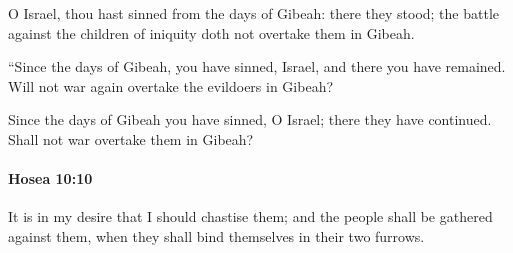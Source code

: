 			\begin{versebox}
					\item[BHS] 
					\item[LXX] 
					\item[ASV] O Israel, thou hast sinned from the days of Gibeah: there they stood; the battle against the children of iniquity doth not overtake them in Gibeah.
					\item[NIV] “Since the days of Gibeah, you have sinned, Israel, and there you have remained. Will not war again overtake the evildoers in Gibeah?
					\item[NRSV] Since the days of Gibeah you have sinned, O Israel; there they have continued. Shall not war overtake them in Gibeah?
			\end{versebox}

		\paragraph{Hosea 10:10} %
			\label{HOSEA-10-10}

			It is in my desire that I should chastise them; and the people shall be gathered against them, when they shall bind themselves in their two furrows.

